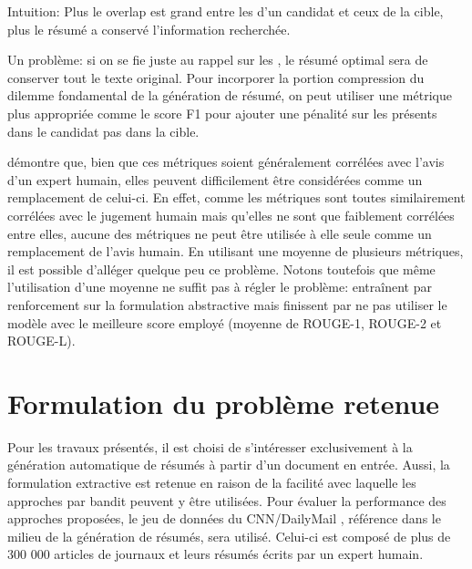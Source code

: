 Intuition: Plus le overlap
est grand entre les \ngrams d'un candidat et ceux de la cible, plus le résumé
a conservé l'information recherchée.

Un problème: si on se fie juste au rappel sur les \ngrams, le résumé optimal sera
de conserver tout le texte original. Pour incorporer la portion compression du dilemme
fondamental de la génération de résumé, on peut utiliser une métrique plus
appropriée comme le score F1 pour ajouter une pénalité sur les \ngrams présents dans
le candidat pas dans la cible.


\citep{peyrard-2019-studying} démontre que, bien que ces métriques soient généralement
corrélées avec l'avis d'un expert humain, elles peuvent difficilement être considérées
comme un remplacement de celui-ci.
En effet, comme les métriques sont toutes similairement corrélées avec le jugement humain
mais qu'elles ne sont que faiblement corrélées entre elles, aucune des métriques
ne peut être utilisée à elle seule comme un remplacement de l'avis humain.
En utilisant une moyenne de plusieurs métriques, il est possible d'alléger quelque peu
ce problème.
Notons toutefois que même l'utilisation d'une moyenne ne suffit pas à régler le problème:
\citep{DBLP:journals/corr/PaulusXS17} entraînent par
renforcement sur la formulation abstractive mais finissent par ne pas
utiliser le modèle avec le meilleure score employé (moyenne de ROUGE-1, ROUGE-2 et ROUGE-L).

\section{Formulation du problème retenue}

Pour les travaux présentés, il est choisi de s'intéresser exclusivement
à la génération automatique de résumés à partir d'un document en entrée.
Aussi, la formulation extractive est retenue en raison de la facilité avec
laquelle les approches par bandit peuvent y être utilisées.
Pour évaluer la performance des approches proposées, le jeu de données du
CNN/DailyMail \citep{10.5555/3298483.3298681}, référence dans le milieu
de la génération de résumés, sera utilisé.
Celui-ci est composé de plus de 300 000 articles de journaux et
leurs résumés écrits par un expert humain.

